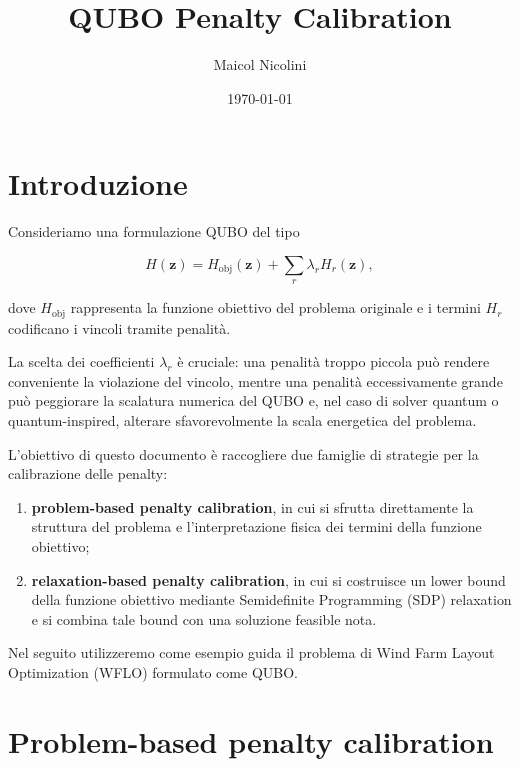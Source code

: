 \documentclass[11pt,a4paper]{report}
\title{QUBO Penalty Calibration}
\author{Maicol Nicolini}
\date{\today}
\begin{document}
\maketitle
\newpage
\tableofcontents
\newpage

\chapter{Introduzione}

Consideriamo una formulazione QUBO del tipo

\[
H(\mathbf z)
=
H_{\mathrm{obj}}(\mathbf z)
+
\sum_r \lambda_r H_r(\mathbf z),
\]

dove $H_{\mathrm{obj}}$ rappresenta la funzione obiettivo del problema
originale e i termini $H_r$ codificano i vincoli tramite penalità.

La scelta dei coefficienti $\lambda_r$ è cruciale:
una penalità troppo piccola può rendere conveniente la violazione del
vincolo, mentre una penalità eccessivamente grande può peggiorare la
scalatura numerica del QUBO e, nel caso di solver quantum o
quantum-inspired, alterare sfavorevolmente la scala energetica del
problema.

L'obiettivo di questo documento è raccogliere due famiglie di strategie
per la calibrazione delle penalty:

\begin{enumerate}
    \item \textbf{problem-based penalty calibration}, in cui si sfrutta
    direttamente la struttura del problema e l'interpretazione fisica
    dei termini della funzione obiettivo;
    \item \textbf{relaxation-based penalty calibration}, in cui si
    costruisce un lower bound della funzione obiettivo mediante
    Semidefinite Programming (SDP) relaxation e si combina tale bound con
    una soluzione feasible nota.
\end{enumerate}

Nel seguito utilizzeremo come esempio guida il problema di Wind Farm
Layout Optimization (WFLO) formulato come QUBO.

\chapter{Problem-based penalty calibration}
\end{document}
